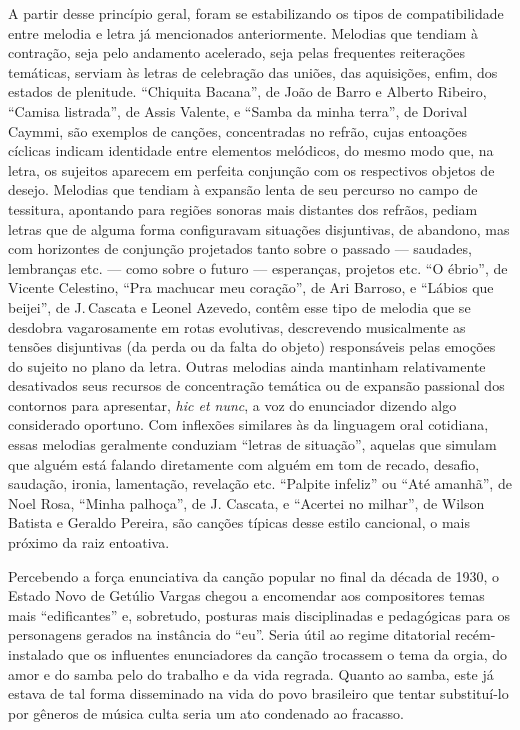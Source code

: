 A partir desse princípio geral, foram se estabilizando os tipos de
compatibilidade entre melodia e letra já mencionados anteriormente.
Melodias que tendiam à contração, seja pelo andamento acelerado, seja
pelas frequentes reiterações temáticas, serviam às letras de celebração
das uniões, das aquisições, enfim, dos estados de plenitude. ``Chiquita
Bacana'', de João de Barro e Alberto Ribeiro, ``Camisa listrada'', de Assis
Valente, e ``Samba da minha terra'', de Dorival Caymmi, são exemplos de
canções, concentradas no refrão, cujas entoações cíclicas indicam
identidade entre elementos melódicos, do mesmo modo que, na letra, os
sujeitos aparecem em perfeita conjunção com os respectivos objetos de
desejo. Melodias que tendiam à expansão lenta de seu percurso no campo
de tessitura, apontando para regiões sonoras mais distantes dos refrãos,
pediam letras que de alguma forma configuravam situações disjuntivas, de
abandono, mas com horizontes de conjunção projetados tanto sobre o
passado --- saudades, lembranças etc. --- como sobre o futuro --- esperanças,
projetos etc. ``O ébrio'', de Vicente Celestino, ``Pra machucar meu
coração'', de Ari Barroso, e ``Lábios que beijei'', de J.\,Cascata e Leonel
Azevedo, contêm esse tipo de melodia que se desdobra vagarosamente em
rotas evolutivas, descrevendo musicalmente as tensões disjuntivas (da
perda ou da falta do objeto) responsáveis pelas emoções do sujeito no
plano da letra. Outras melodias ainda mantinham relativamente
desativados seus recursos de concentração temática ou de expansão
passional dos contornos para apresentar, \textit{hic et nunc}, a voz do
enunciador dizendo algo considerado oportuno. Com inflexões similares às
da linguagem oral cotidiana, essas melodias geralmente conduziam
``letras de situação'', aquelas que simulam que alguém está falando
diretamente com alguém em tom de recado, desafio, saudação, ironia,
lamentação, revelação etc. ``Palpite infeliz'' ou ``Até amanhã'', de Noel
Rosa, ``Minha palhoça'', de J. Cascata, e ``Acertei no milhar'', de Wilson
Batista e Geraldo Pereira, são canções típicas desse estilo cancional, o
mais próximo da raiz entoativa.

Percebendo a força enunciativa da canção popular no final da década de
1930, o Estado Novo de Getúlio Vargas chegou a encomendar aos
compositores temas mais ``edificantes'' e, sobretudo, posturas mais
disciplinadas e pedagógicas para os personagens gerados na instância do
``eu''. Seria útil ao regime ditatorial recém-instalado que os
influentes enunciadores da canção trocassem o tema da orgia, do amor e
do samba pelo do trabalho e da vida regrada. Quanto ao samba, este já
estava de tal forma disseminado na vida do povo brasileiro que tentar
substituí-lo por gêneros de música culta seria um ato condenado ao
fracasso.

